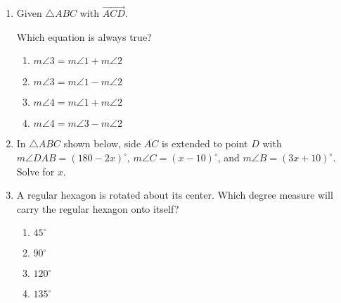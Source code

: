 \documentclass[12pt, twoside]{article}
\begin{document}
\begin{enumerate}
\newpage
\item Given $\triangle ABC$ with $\overrightarrow{ACD}$.
  \begin{center}
  \end{center}
  Which equation is always true?
  \begin{multicols}{2}
  \begin{enumerate}
    \item $m\angle 3 = m\angle 1 + m\angle 2$
    \item $m\angle 3 = m\angle 1 - m\angle 2$ 
    \item $m\angle 4 = m\angle 1 + m\angle 2$
    \item $m\angle 4 = m\angle 3 - m\angle 2$
  \end{enumerate}
  \end{multicols}

\item In $\triangle ABC$ shown below, side $\overline{AC}$ is extended to point $D$ with $m\angle DAB=(180-2x)^\circ$, $m\angle C=(x-10)^\circ$, and $m\angle B=(3x+10)^\circ$. Solve for $x$.
  \begin{flushleft}
  \end{flushleft} \vspace{2cm}

\item A regular hexagon is rotated about its center. Which degree measure will carry the regular hexagon onto itself? 
\begin{multicols}{2}
  \begin{enumerate}
    \item $45^\circ$
    \item $90^\circ$
    \item $120^\circ$
    \item $135^\circ$
  \end{enumerate}
\end{multicols}


\end{enumerate}
\end{document}
